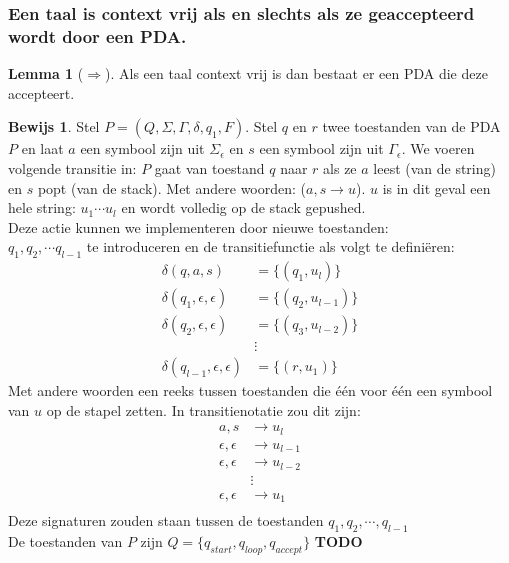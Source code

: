 \documentclass[12pt,a4paper]{article}
\theoremstyle{definition}
\newtheorem{bewijs}{Bewijs}[section]
\newtheorem{lemma}{Lemma}[section]
\newcommand{\ra}{\ensuremath{\rightarrow}}
\begin{document}
\subsubsection{Een taal is context vrij als en slechts als ze geaccepteerd wordt door een PDA.}
	\begin{lemma}[$\Rightarrow$]
		Als een taal context vrij is dan bestaat er een PDA die deze accepteert.
		
		\begin{bewijs}
			Stel $P = (Q,\Sigma,\Gamma,\delta,q_1,F)$. Stel $q$ en $r$ twee toestanden van de PDA $P$ en laat $a$ een symbool zijn uit $\Sigma_\epsilon$ en $s$ een symbool zijn uit $\Gamma_\epsilon$. We voeren volgende transitie in: $P$ gaat van toestand $q$ naar $r$ als ze $a$ leest (van de string) en $s$ popt (van de stack). Met andere woorden: ($a,s\ra u$). $u$ is in dit geval een hele string: $u_1 \cdots u_l$ en wordt volledig op de stack gepushed.\\
			Deze actie kunnen we implementeren door nieuwe toestanden: 
			\\$q_1, q_2, \cdots q_{l-1}$ te introduceren en de transitiefunctie als volgt te definiëren: \begin{align*}
			\delta(q,a,s) &= \{(q_1,u_l)\}\\
			\delta(q_1,\epsilon,\epsilon) &= \{(q_2,u_{l-1})\}\\
			\delta(q_2,\epsilon,\epsilon) &= \{(q_3,u_{l-2})\}\\
			&\vdots\\
			\delta(q_{l-1},\epsilon,\epsilon) &= \{(r,u_1)\}
			\end{align*}
			Met andere woorden een reeks tussen toestanden die één voor één een symbool van $u$ op de stapel zetten. In transitienotatie zou dit zijn: 
			\begin{align*}
			a,s&\ra u_l\\
			\epsilon,\epsilon &\ra u_{l-1}\\
			\epsilon,\epsilon &\ra u_{l-2}\\
			&\vdots\\
			\epsilon,\epsilon &\ra u_{1}\\
			\end{align*}
			Deze signaturen zouden staan tussen de toestanden $q_1,q_2,\cdots,q_{l-1}$\\
			
			De toestanden van $P$ zijn $Q=\{q_{start},q_{loop}, q_{accept}\}$
			\textbf{\LARGE TODO}
		\end{bewijs}
	\end{lemma}
\end{document}
